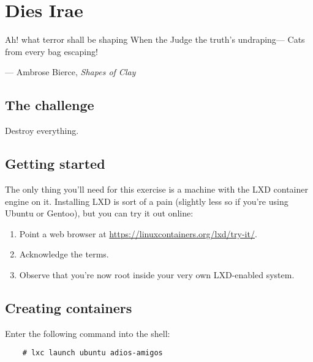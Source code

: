 \chapter*{Dies Irae}

\begin{quoting}
  Ah! what terror shall be shaping\newline
  When the Judge the truth's undraping---\newline
  Cats from every bag escaping!

  \begin{flushright}
    --- Ambrose Bierce, \textit{Shapes of Clay}
  \end{flushright}
\end{quoting}

\vspace{2em}

\section*{The challenge}

Destroy everything.

\section*{Getting started}

The only thing you'll need for this exercise is a machine with the LXD container engine on it. Installing LXD is sort of a pain (slightly less so if you're using Ubuntu or Gentoo), but you can try it out online:

\begin{enumerate}
  \item Point a web browser at \url{https://linuxcontainers.org/lxd/try-it/}.
  \item Acknowledge the terms.
  \item Observe that you're now root inside your very own LXD-enabled system.
\end{enumerate}

\section*{Creating containers}

Enter the following command into the shell:

\begin{verbatim}
    # lxc launch ubuntu adios-amigos
\end{verbatim}

